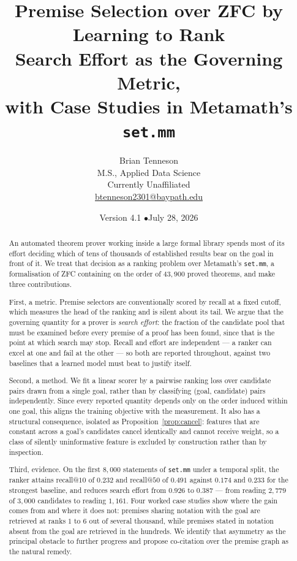 \documentclass[11pt]{article}
\title{\vspace{-1cm}\textbf{\Large Premise Selection over ZFC by Learning to Rank}\\[0.5em]
{\large Search Effort as the Governing Metric,\\ with Case Studies in Metamath's \texttt{set.mm}}}
\author{Brian Tenneson\\ M.S., Applied Data Science\\ Currently Unaffiliated\\
\href{mailto:btenneson2301@baypath.edu}{btenneson2301@baypath.edu}}
\date{Version 4.1 \quad$\bullet$\quad July 28, 2026}
\theoremstyle{plain}
\theoremstyle{definition}
\theoremstyle{remark}
\begin{document}
\maketitle
\thispagestyle{empty}

\begin{abstract}
\noindent
An automated theorem prover working inside a large formal library spends most of
its effort deciding which of tens of thousands of established results bear on the
goal in front of it. We treat that decision as a ranking problem over Metamath's
\texttt{set.mm}, a formalisation of ZFC containing on the order of $43{,}900$
proved theorems, and make three contributions.

First, a metric. Premise selectors are conventionally scored by recall at a
fixed cutoff, which measures the head of the ranking and is silent about its
tail. We argue that the governing quantity for a prover is \emph{search effort}:
the fraction of the candidate pool that must be examined before every premise of
a proof has been found, since that is the point at which search may stop. Recall
and effort are independent --- a ranker can excel at one and fail at the other
--- so both are reported throughout, against two baselines that a learned model
must beat to justify itself.

Second, a method. We fit a linear scorer by a pairwise ranking loss over
candidate pairs drawn from a single goal, rather than by classifying
(goal, candidate) pairs independently. Since every reported quantity depends
only on the order induced within one goal, this aligns the training objective
with the measurement. It also has a structural consequence, isolated as
Proposition~\ref{prop:cancel}: features that are constant across a goal's
candidates cancel identically and cannot receive weight, so a class of silently
uninformative feature is excluded by construction rather than by inspection.

Third, evidence. On the first $8{,}000$ statements of \texttt{set.mm} under a
temporal split, the ranker attains recall@$10$ of $0.232$ and recall@$50$ of
$0.491$ against $0.174$ and $0.233$ for the strongest baseline, and reduces
search effort from $0.926$ to $0.387$ --- from reading $2{,}779$ of $3{,}000$
candidates to reading $1{,}161$. Four worked case studies show where the gain
comes from and where it does not: premises sharing notation with the goal are
retrieved at ranks $1$ to $6$ out of several thousand, while premises stated in
notation absent from the goal are retrieved in the hundreds. We identify that
asymmetry as the principal obstacle to further progress and propose co-citation
over the premise graph as the natural remedy.
\end{abstract}
\end{document}

